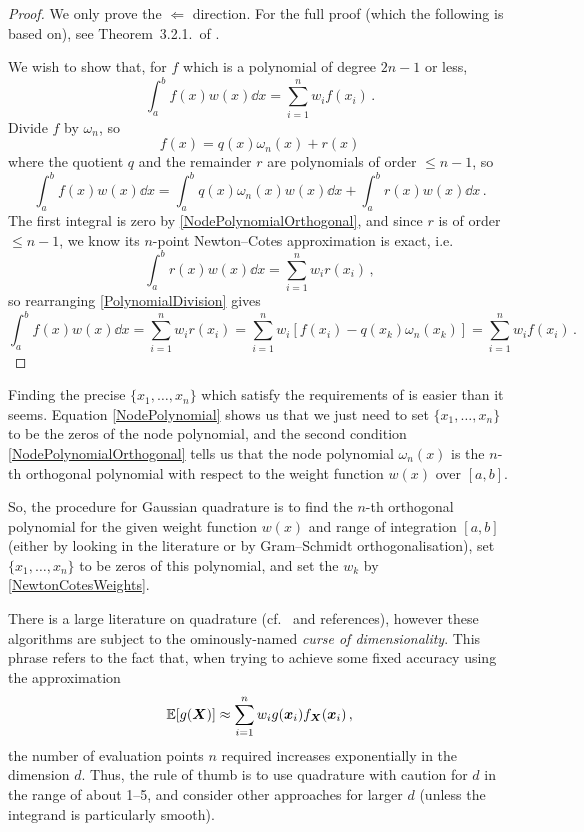 \begin{proof}
We only prove the $\Leftarrow$ direction. For the full proof (which the following is based on), see Theorem~3.2.1.\ of \cite{gautschi2011numerical}.

We wish to show that, for $f$ which is a polynomial of degree $2n-1$ or less,
\[ \int_a^b f(x) w(x) \dd x = \sum_{i=1}^n w_i f(x_i) \,. \]
Divide $f$ by $\omega_n$, so
\begin{equation} \label{PolynomialDivision}
	f(x) = q(x) \omega_n(x) + r(x)
\end{equation}
where the quotient $q$ and the remainder $r$ are polynomials of order $\le n-1$, so
\[ \int_a^b f(x) w(x) \dd x = \int_a^b q(x) \omega_n(x) w(x) \dd x + \int_a^b r(x) w(x) \dd x \,. \]
The first integral is zero by \eqref{NodePolynomialOrthogonal}, %
and since $r$ is of order $\le n-1$, we know its $n$-point Newton--Cotes approximation is exact, i.e.
\[ \int_a^b r(x) w(x) \dd x = \sum_{i=1}^n w_i r(x_i) \,, \]
so rearranging \eqref{PolynomialDivision} gives
\[ \int_a^b f(x) w(x) \dd x = \sum_{i=1}^n w_i r(x_i) = \sum_{i=1}^n w_i [f(x_i) - q(x_k) \omega_n(x_k)] = \sum_{i=1}^n w_i f(x_i) \,. \]
\end{proof}

Finding the precise $\{x_1, \dots, x_n\}$ which satisfy the requirements of  is easier than it seems. Equation \eqref{NodePolynomial} shows us that we just need to set $\{x_1, \dots, x_n\}$ to be the zeros of the node polynomial, and the second condition \eqref{NodePolynomialOrthogonal} tells us that the node polynomial $\omega_n(x)$ is the $n$-th orthogonal polynomial with respect to the weight function $w(x)$ over $[a,b]$.

So, the procedure for Gaussian quadrature is to find the $n$-th orthogonal polynomial for the given weight function $w(x)$ and range of integration $[a,b]$ (either by looking in the literature or by Gram--Schmidt orthogonalisation), set $\{x_1, \dots, x_n\}$ to be zeros of this polynomial, and set the $w_k$ by \eqref{NewtonCotesWeights}.

There is a large literature on quadrature (cf.\ \cite{gautschi2011numerical} and references), however these algorithms are subject to the ominously-named \emph{curse of dimensionality}. This phrase refers to the fact that, when trying to achieve some fixed accuracy using the approximation %
\begin{equation*} \label{basic_num_int}
\operatorname{{\mathbb E}}[g(\bm{X})] \approx \sum_{i=1}^n w_i g( \bm{x}_i ) f_{\bm{X}}( \bm{x}_i ) \,,
\end{equation*}
the number of evaluation points $n$ required increases exponentially in the dimension $d$. Thus, the rule of thumb is to use quadrature with caution for $d$ in the range of about 1--5, and consider other approaches for larger $d$ (unless the integrand is particularly smooth).


